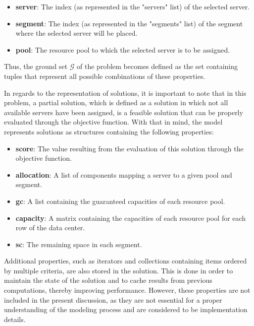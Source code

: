 \begin{itemize} \item \textbf{server}: The index (as represented in the
        "servers" list) of the selected server. \item \textbf{segment}: The index (as
        represented in the "segments" list) of the segment where the selected server
        will be placed. \item \textbf{pool}: The resource pool to which the selected
        server is to be assigned. \end{itemize}

Thus, the ground set $\mathcal{G}$ of the problem becomes defined as the set
containing tuples that represent all possible combinations of these properties.

In regards to the representation of solutions, it is important to note that in
this problem, a partial solution, which is defined as a solution in which not
all available servers have been assigned, is a feasible solution that can be
properly evaluated through the objective function. With that in mind, the model
represents solutions as structures containing the following properties:

\begin{itemize} \item \textbf{score}: The value resulting from the evaluation
        of this solution through the objective function. \item \textbf{allocation}: A
        list of components mapping a server to a given pool and segment. \item
        \textbf{gc}: A list containing the guaranteed capacities of each resource pool.
  \item \textbf{capacity}: A matrix containing the capacities of each resource
        pool for each row of the data center. \item \textbf{sc}: The remaining space in
        each segment. \end{itemize}

Additional properties, such as iterators and collections containing items
ordered by multiple criteria, are also stored in the solution. This is done in
order to maintain the state of the solution and to cache results from previous
computations, thereby improving performance. However, these properties are not
included in the present discussion, as they are not essential for a proper
understanding of the modeling process and are considered to be implementation
details.

